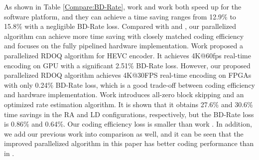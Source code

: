 \documentclass[lettersize,journal]{IEEEtran}
\begin{document}
As shown in Table \ref{Compare:BD-Rate}, work \cite{lee2015fastquantizationmethod} and work \cite{xu2020simplifiedLevelEstimation} both speed up for the software platform, and they can achieve a time saving ranges from 12.9\% to 15.8\% with a negligible BD-Rate loss. Compared with \cite{lee2015fastquantizationmethod} and \cite{xu2020simplifiedLevelEstimation}, our parallelized algorithm can achieve more time saving with closely matched coding efficiency and focuses on the fully pipelined hardware implementation. Work \cite{igarashi2018parallelGPU} proposed a parallelized RDOQ algorithm for HEVC encoder. It achieves 4K@60fps real-time encoding on GPU with a significant 2.51\% BD-Rate loss. However, our proposed parallelized RDOQ algorithm achieves 4K@30FPS real-time encoding on FPGAs with only 0.24\% BD-Rate loss, which is a good trade-off between coding efficiency and hardware implementation. Work \cite{xu2022hardwarefriendlyforrdoq} introduces all-zero block skipping and an optimized rate estimation algorithm. It is shown that it obtains 27.6\% and 30.6\% time savings in the RA and LD configurations, respectively, but the BD-Rate loss is 0.86\% and 0.64\%. Our coding efficiency loss is smaller than work \cite{xu2022hardwarefriendlyforrdoq}. In addition, we add our previous work \cite{zhao2023scanline} into comparison as well, and it can be seen that the improved parallelized algorithm in this paper has better coding performance than in \cite{zhao2023scanline}. 

\end{document}
